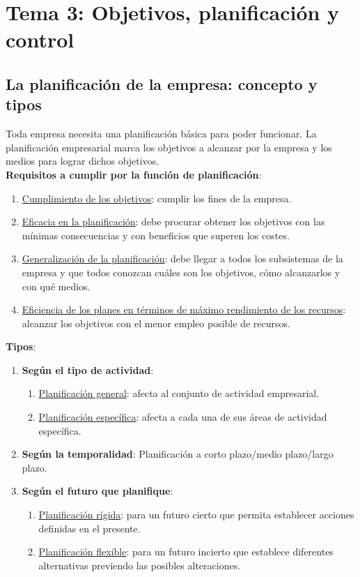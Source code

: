 \documentclass[12pt]{article}
\theoremstyle{definition_wo_parentheses}
\begin{document}
\section{Tema 3: Objetivos, planificación y control}
\subsection{La planificación de la empresa: concepto y tipos}
Toda empresa necesita una planificación básica para poder funcionar. La planificación empresarial marca los objetivos a alcanzar por la empresa y los medios para lograr dichos objetivos.
\\

\textbf{Requisitos a cumplir por la función de planificación}:
\begin{enumerate}
\item \underline{Cumplimiento de los objetivos}: cumplir los fines de la empresa.
\item \underline{Eficacia en la planificación}: debe procurar obtener los objetivos con las mínimas consecuencias y con beneficios que superen los costes.
\item \underline{Generalización de la planificación}: debe llegar a todos los subsistemas de la empresa y que todos conozcan cuáles son los objetivos, cómo alcanzarlos y con qué medios.
\item \underline{Eficiencia de los planes en términos de máximo rendimiento de los recursos}: alcanzar los objetivos con el menor empleo posible de recursos.
\end{enumerate}

\textbf{Tipos}:
\begin{enumerate}
\item \textbf{Según el tipo de actividad}:
\begin{enumerate}
\item \underline{Planificación general}: afecta al conjunto de actividad empresarial.
\item \underline{Planificación específica}: afecta a cada una de sus áreas de actividad específica.
\end{enumerate}
\item \textbf{Según la temporalidad}: Planificación a corto plazo/medio plazo/largo plazo.
\item \textbf{Según el futuro que planifique}:
\begin{enumerate}
\item \underline{Planificación rígida}: para un futuro cierto que permita establecer acciones definidas en el presente.
\item \underline{Planificación flexible}: para un futuro incierto que establece diferentes alternativas previendo las posibles alteraciones.
\end{enumerate}
\end{enumerate}
\end{document}
